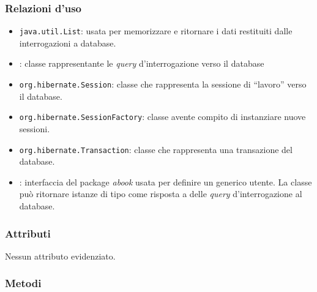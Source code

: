 \subsubsection*{Relazioni d'uso}

\begin{itemize}
	\item \texttt{java.util.List}: usata per memorizzare e ritornare i dati restituiti dalle interrogazioni a database.
	\item {}: classe rappresentante le \textit{query} d'interrogazione verso il database
	\item \texttt{org.hibernate.Session}: classe che rappresenta la sessione di ``lavoro'' verso il database.
	\item \texttt{org.hibernate.SessionFactory}: classe avente compito di instanziare nuove sessioni.
	\item \texttt{org.hibernate.Transaction}: classe che rappresenta una transazione del database.
	\item {}: interfaccia del package \textit{abook} usata per definire un generico utente. La classe può ritornare istanze di tipo  come risposta a delle \textit{query} d'interrogazione al database.
	
\end{itemize}

\subsubsection*{Attributi}

Nessun attributo evidenziato.

\subsubsection*{Metodi}

